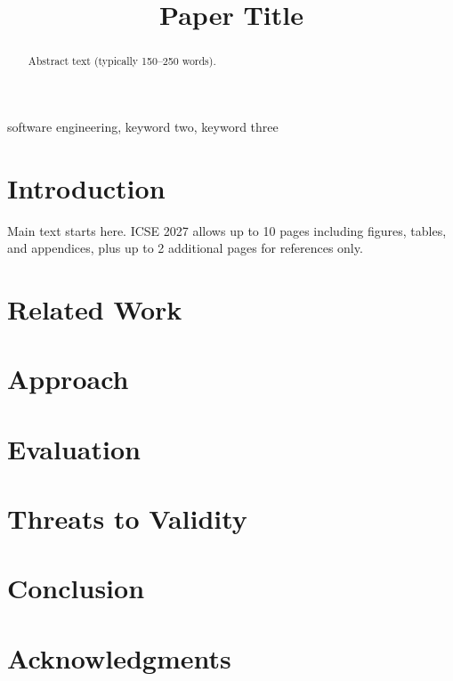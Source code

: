 \documentclass[10pt,conference]{IEEEtran}
\begin{document}
\title{Paper Title}

\author{
}

\maketitle

\begin{abstract}
Abstract text (typically 150--250 words).
\end{abstract}

\begin{IEEEkeywords}
software engineering, keyword two, keyword three
\end{IEEEkeywords}

\section{Introduction}
Main text starts here. ICSE 2027 allows up to 10 pages including figures,
tables, and appendices, plus up to 2 additional pages for references only.

\section{Related Work}

\section{Approach}

\section{Evaluation}

\section{Threats to Validity}

\section{Conclusion}

\section*{Acknowledgments}



\end{document}
